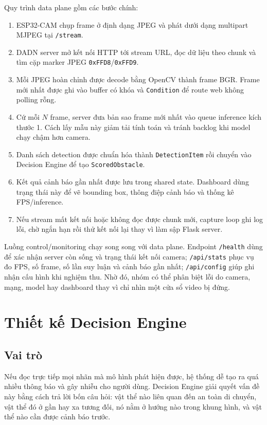 \documentclass[oneside,final]{hcmut-report}
\begin{document}
Quy trình data plane gồm các bước chính:
\begin{enumerate}
  \item ESP32-CAM chụp frame ở định dạng JPEG và phát dưới dạng multipart MJPEG tại \texttt{/stream}.
  \item DADN server mở kết nối HTTP tới stream URL, đọc dữ liệu theo chunk và tìm cặp marker JPEG \texttt{0xFFD8}/\texttt{0xFFD9}.
  \item Mỗi JPEG hoàn chỉnh được decode bằng OpenCV thành frame BGR. Frame mới nhất được ghi vào buffer có khóa và \texttt{Condition} để route web không polling rỗng.
  \item Cứ mỗi $N$ frame, server đưa bản sao frame mới nhất vào queue inference kích thước 1. Cách lấy mẫu này giảm tải tính toán và tránh backlog khi model chạy chậm hơn camera.
  \item Danh sách detection được chuẩn hóa thành \texttt{DetectionItem} rồi chuyển vào Decision Engine để tạo \texttt{ScoredObstacle}.
  \item Kết quả cảnh báo gần nhất được lưu trong shared state. Dashboard dùng trạng thái này để vẽ bounding box, thông điệp cảnh báo và thống kê FPS/inference.
  \item Nếu stream mất kết nối hoặc không đọc được chunk mới, capture loop ghi log lỗi, chờ ngắn hạn rồi thử kết nối lại thay vì làm sập Flask server.
\end{enumerate}

Luồng control/monitoring chạy song song với data plane. Endpoint \texttt{/health} dùng để xác nhận server còn sống và trạng thái kết nối camera; \texttt{/api/stats} phục vụ đo FPS, số frame, số lần suy luận và cảnh báo gần nhất; \texttt{/api/config} giúp ghi nhận cấu hình khi nghiệm thu. Nhờ đó, nhóm có thể phân biệt lỗi do camera, mạng, model hay dashboard thay vì chỉ nhìn một cửa sổ video bị đứng.

\section{Thiết kế Decision Engine}

\subsection{Vai trò}
Nếu đọc trực tiếp mọi nhãn mà mô hình phát hiện được, hệ thống dễ tạo ra quá nhiều thông báo và gây nhiễu cho người dùng. Decision Engine giải quyết vấn đề này bằng cách trả lời bốn câu hỏi: vật thể nào liên quan đến an toàn di chuyển, vật thể đó ở gần hay xa tương đối, nó nằm ở hướng nào trong khung hình, và vật thể nào cần được cảnh báo trước.
\end{document}
